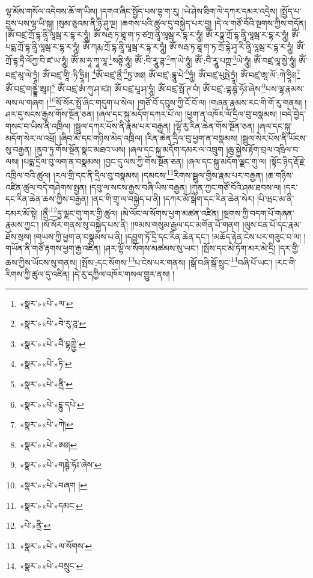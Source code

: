ལྷ་མོས་གསོལ་འདེབས་ཆོ་ག་ཡིས། །དགའ་ཞིང་སྤྱོད་པས་བྷ་ག་རུ། །ཡེ་ཤེས་ཐིག་ལེ་དཀར་དམར་འདྲེས། །སྤྱོད་པ་བྱས་པས་ལྷ་ཡི་སྐུ། །སུམ་ཅུའམ་ནི་ཉི་ཤུ་ལྔ། །ཆགས་པའི་ཚུལ་དུ་བསྐྱེད་པར་བྱ། །དེ་ལ་གཙོ་བོའི་སྔགས་ཀྱིས་གདོན། །ཨོཾ་བཛྲ་ཀྲོ་དྷ་ནཱི་ལཱམྦ་ར་དྷ་ར་ཧཱུཾ། ཨོཾ་སརྦ་ཏ་ཐཱ་ག་ཏ་ཙཀྲ་ནཱི་ལཱམྦ་ར་དྷ་ར་ཧཱུཾ། ཨོཾ་རཏྣ་ཀྲོ་དྷ་ནཱི་ལཱམྦ་ར་དྷ་ར་ཧཱུཾ། ཨོཾ་པདྨ་ཀྲོ་དྷ་ནཱི་ལཱམྦ་ར་དྷ་ར་ཧཱུཾ། ཨོཾ་ཀརྨ་ཀྲོ་དྷ་ནཱི་ལཱམྦ་ར་དྷ་ར་ཧཱུཾ། ཨོཾ་སརྦ་ཏ་ཐཱ་ག་ཏ་ཀྲོ་དྷེ་ཤྭ་རི་ནཱི་ལཱམྦ་ར་དྷ་ར་ཧཱུཾ། ཨོཾ་ཀྲོ་དྷ་ཏྲཻ་ལོཀྱ་བི་ཛ་ཡ་ཧཱུཾ། ཨོཾ་མ་ཧཱ་ཀཱ་ལཱ་\footnote{«སྣར་»«པེ་»ལ་}སནྟི་ཧཱུཾ། ཨོཾ་:བི་རཱུ་ཌྷ་\footnote{«སྣར་»«པེ་»བེ་རུ་ཌཱ་}ཀ་ཡེ་ཧཱུཾ། ཨོཾ་:བཻ་རཱུ་པཀྵ་\footnote{«སྣར་»«པེ་»བཻ་བྷཀྵྱེ་}ཡེ་ཧཱུཾ། ཨོཾ་བཛྲ་ལཱ་སྱེ་ཧཱུཾ། ཨོཾ་བཛྲ་མཱ་ལེ་ཏྲཱཾ། ཨོཾ་བཛྲ་གཱི་:ཏི་ཧྲཱིཿ། \footnote{«སྣར་»«པེ་»ཏི་}ཨོཾ་བཛྲ་ནྲྀ་\footnote{«སྣར་»«པེ་»ནྲི་}ཏྱ་ཨཿ། ཨོཾ་བཛྲ་:དྷཱུ་པེ་\footnote{«སྣར་»«པེ་»ངྷུ་དཔེ་}ཧཱུཾ། ཨོཾ་བཛྲ་པུཥྤེ་ཏྲཱཾ། ཨོཾ་བཛྲ་ཨཱ་ལོ་:ཀེ་ཧྲཱིཿ།\footnote{«སྣར་»«པེ་»ཀེ།} ཨོཾ་བཛྲ་གནྡྷེ་ཨཱཿ།\footnote{«སྣར་»«པེ་»ཨཿ།} ཨོཾ་བཛྲ་ཨཾ་ཀུ་ཤ་ཛཿ། ཨོཾ་བཛྲ་པཱ་ཤ་ཧཱུཾ། ཨོཾ་བཛྲ་སྥོ་ཊ་བཾ། ཨོཾ་བཛྲ་:གྷཎྚེ་ཧོཿ་ཞེས་\footnote{«སྣར་»«པེ་»གཎྚེ་ཧོཿ་ཞེས་}པས་ལྷ་རྣམས་ལས་ལ་གཞག །\footnote{«སྣར་»«པེ་»བཞག །}སོ་སོར་སྤྲོ་ཞིང་གདུག་པ་སེལ། །གཙོ་བོ་དབུས་ཀྱི་ངོ་བོ་ལ། །གཞན་རྣམས་རང་གི་གོ་རུ་གནས། །ཤར་དུ་སངས་རྒྱས་གོས་སྔོན་ཅན། །ཞལ་དང་སྐུ་མདོག་དཀར་པོ་ལ། །ཕྱག་ན་འཁོར་ལོ་དྲིལ་བུ་བསྣམས། །བདེ་བྱེད་གསང་བ་ཡིས་ནི་འཁྲིལ། །སྦྲུལ་དཀར་པོས་ནི་རྣམ་པར་བརྒྱན། །ལྷོ་རུ་རིན་ཆེན་གོས་སྔོན་ཅན། །ཞལ་དང་སྐུ་མདོག་སེར་ལ་འཕྲོ། །ཞིབ་མོ་དང་གཉིས་མེད་འཁྲིལ། །རིན་ཆེན་དྲིལ་བུ་ཕྱག་ན་བསྣམས། །སྦྲུལ་སེར་པོས་ནི་ཡོངས་སུ་བརྒྱན། །ནུབ་ཏུ་གོས་སྔོན་སྣང་མཐའ་ཡས། །ཞལ་དང་སྐུ་མདོག་དམར་ལ་འཁྲུག །ཆུ་སྐྱེས་རྟོག་བྲལ་འཁྲིལ་བ་ལས། །པདྨ་དྲིལ་བུ་ལག་ན་བསྣམས། །བྱང་དུ་ལས་ཀྱི་གོས་སྔོན་ཅན། །ཞལ་དང་སྐུ་མདོག་ལྗང་གུ་ལ། །སྟོང་ཉིད་རྡོ་རྗེ་འཁྲིལ་བའི་ཚུལ། །རལ་གྲི་དང་ནི་དྲིལ་བུ་བསྣམས། །དམངས་\footnote{«སྣར་»«པེ་»དམང་}རིགས་སྦྲུལ་གྱིས་རྣམ་པར་བརྒྱན། །ཆ་གཉིས་འཛིན་ཚུལ་བདེ་གཤེགས་སྤྱན། །དབུ་ལ་སངས་རྒྱས་བཞི་ཡིས་བརྒྱན། །ཀུན་ཀྱང་གཙོ་བོའི་ཤམ་ཐབས་ལ། །དར་དང་རིན་ཆེན་ཆས་ཀྱིས་བརྒྱན། །ནང་གི་གྲྭ་ལ་བསྐྱེད་པ་ནི། །དཀར་མོ་སྒེག་དང་རིན་ཆེན་སེར། །པི་ཝང་མ་ནི་དམར་མོ་སྟེ། །ནྲྀ་\footnote{«པེ་»ནྲི་}ཏྱ་ལྗང་གུ་གར་གྱི་ཚུལ། །མེ་ལོང་ལ་སོགས་ཕྱག་མཚན་འཛིན། །སྔགས་ཀྱི་བདག་པོ་གཞན་རྣམས་ཀྱང་། །སོ་སོར་གནས་སུ་བསྐྱེད་པས་ནི། །ཁམས་གསུམ་རྒྱལ་དང་མགོན་པོ་གནག །ལུས་ངན་པོ་དང་རྣམ་ཐོས་སྲས། །གཡས་ཀྱི་ཕྱག་ན་བསྣམས་པ་ནི། །དབྱུག་ཏོ་དྲི་དང་རིན་ཆེན་དང་། །མཆོད་རྟེན་ངེས་པར་གཟུང་བ་ལ། །གཡོན་ནི་གཙོ་རྟགས་ཕྱག་རྒྱ་འཛིན། །ཤར་ལྷོ་ལ་སོགས་མཚམས་སུ་ཡང་། །སྤོས་དང་མེ་ཏོག་མར་མེ་དྲི། །དར་གྱི་ཆས་ཀྱིས་ཡོངས་སུ་གནས། །སྤོས་:དང་སོགས་\footnote{«སྣར་»«པེ་»ལ་སོགས་}པ་ངེས་པར་གནས། །སྒོ་བཞི་སྒོ་སྲུང་\footnote{«སྣར་»«པེ་»བསྲུང་}བཞི་པོ་ཡང་། །རང་གི་རིགས་ཀྱི་ཚུལ་དུ་འཛིན། །དེ་རུ་དཀྱིལ་འཁོར་གསལ་གྱུར་ནས། །
